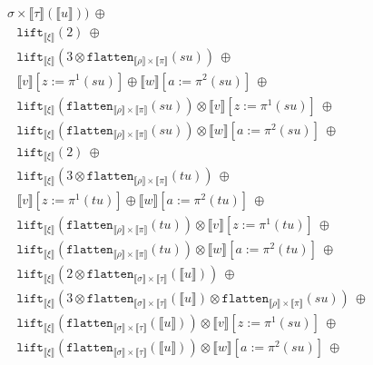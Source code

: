 \documentclass[runningheads,a4paper]{llncs}
\newcommand{\typeinterpret}[1]{\llbracket #1 \rrbracket}
\newcommand{\interpret}[1]{\llbracket #1 \rrbracket}
\newcommand{\flatten}{\mathtt{flatten}}
\newcommand{\lift}{\mathtt{lift}}
\begin{document}
\begin{itemize}
\[\begin{array}{l}
{{    \sigma} \times \typeinterpret{\tau}}(\interpret{u}))\ \oplus \\
  \phantom{A}
    \lift_{\typeinterpret{\xi}}(2)\ \oplus \\
  \phantom{A}
    \lift_{\typeinterpret{\xi}}(3 \otimes \flatten_{
    \typeinterpret{\rho} \times \typeinterpret{\pi}}(su))\ \oplus \\
  \phantom{A}
    \interpret{v}[z:=\pi^1(su)] \oplus
    \interpret{w}[a:=\pi^2(su)]\ \oplus \\
  \phantom{A}
    \lift_{\typeinterpret{\xi}}(\flatten_{\typeinterpret{\rho} \times
    \typeinterpret{\pi}}(su)) \otimes \interpret{v}[z:=\pi^1(su)]\ 
    \oplus \\
  \phantom{A}
    \lift_{\typeinterpret{\xi}}(\flatten_{\typeinterpret{\rho}
    \times \typeinterpret{\pi}}(su)) \otimes \interpret{w}[a:=\pi^2(su)]
    \ \oplus \\
  \phantom{A}
    \lift_{\typeinterpret{\xi}}(2)\ \oplus \\
  \phantom{A}
    \lift_{\typeinterpret{\xi}}(3 \otimes \flatten_{
    \typeinterpret{\rho} \times \typeinterpret{\pi}}(tu))\ \oplus \\
  \phantom{A}
    \interpret{v}[z:=\pi^1(tu)] \oplus
    \interpret{w}[a:=\pi^2(tu)]\ \oplus \\
  \phantom{A}
    \lift_{\typeinterpret{\xi}}(\flatten_{\typeinterpret{\rho} \times
    \typeinterpret{\pi}}(tu)) \otimes \interpret{v}[z:=\pi^1(tu)]\ 
    \oplus \\
  \phantom{A}
    \lift_{\typeinterpret{\xi}}(\flatten_{\typeinterpret{\rho}
    \times \typeinterpret{\pi}}(tu)) \otimes \interpret{w}[a:=\pi^2(tu)]
    \ \oplus \\
  \phantom{A}
    \lift_{\typeinterpret{\xi}}(2 \otimes \flatten_{
    \typeinterpret{\sigma} \times \typeinterpret{\tau}}(
    \interpret{u}))\ \oplus \\
  \phantom{A}
    \lift_{\typeinterpret{\xi}}(3 \otimes \flatten_{
    \typeinterpret{\sigma} \times \typeinterpret{\tau}}(
    \interpret{u}) \otimes \flatten_{
    \typeinterpret{\rho} \times \typeinterpret{\pi}}(su))\ \oplus \\
  \phantom{A}
    \lift_{\typeinterpret{\xi}}(\flatten_{\typeinterpret{\sigma}
    \times \typeinterpret{\tau}}(\interpret{u})) \otimes
    \interpret{v}[z:=\pi^1(su)]\ \oplus \\
  \phantom{A}
    \lift_{\typeinterpret{\xi}}(\flatten_{\typeinterpret{\sigma}
    \times \typeinterpret{\tau}}(\interpret{u})) \otimes
    \interpret{w}[a:=\pi^2(su)]\ \oplus \\

\end{array}\]
\end{itemize}
\end{document}
